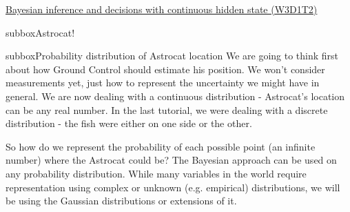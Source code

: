 \begin{textbox}{\href{https://compneuro.neuromatch.io/tutorials/W3D1_BayesianDecisions/student/W3D1_Tutorial2.html}{Bayesian inference and decisions with continuous hidden state (W3D1T2)} }
\begin{subbox}{subbox}{Astrocat!}
\end{subbox}

\begin{subbox}{subbox}{Probability distribution of Astrocat location}
\scriptsize
We are going to think first about how Ground Control should estimate his position. We won't consider measurements yet, just how to represent the uncertainty we might have in general. We are now dealing with a continuous distribution - Astrocat's location can be any real number. In the last tutorial, we were dealing with a discrete distribution - the fish were either on one side or the other. 

So how do we represent the probability of each possible point (an infinite number) where the Astrocat could be? 
The Bayesian approach can be used on any probability distribution. While many variables in the world require representation using complex or unknown (e.g. empirical) distributions, we will be using the Gaussian distributions or extensions of it.

\end{subbox}
\end{textbox}
